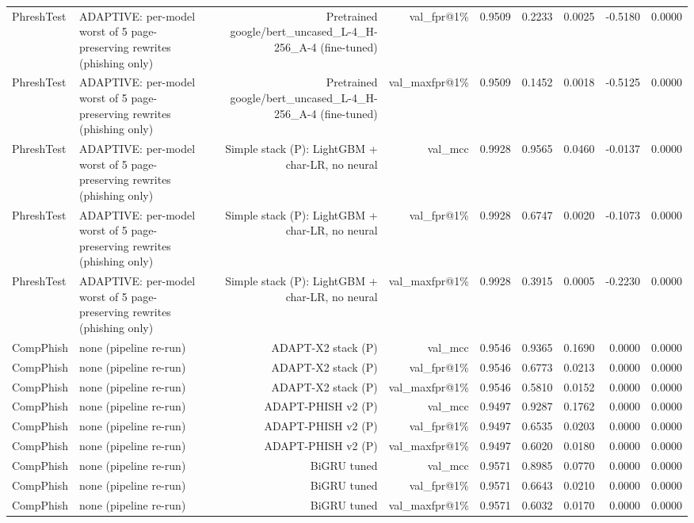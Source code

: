 \begin{table}[t]
\begin{tabular}{llrrrrrrr}
PhreshTest & ADAPTIVE: per-model worst of 5 page-preserving rewrites (phishing only) & Pretrained google/bert\_uncased\_L-4\_H-256\_A-4 (fine-tuned) & val\_fpr@1\% & 0.9509 & 0.2233 & 0.0025 & -0.5180 & 0.0000 \\
PhreshTest & ADAPTIVE: per-model worst of 5 page-preserving rewrites (phishing only) & Pretrained google/bert\_uncased\_L-4\_H-256\_A-4 (fine-tuned) & val\_maxfpr@1\% & 0.9509 & 0.1452 & 0.0018 & -0.5125 & 0.0000 \\
PhreshTest & ADAPTIVE: per-model worst of 5 page-preserving rewrites (phishing only) & Simple stack (P): LightGBM + char-LR, no neural & val\_mcc & 0.9928 & 0.9565 & 0.0460 & -0.0137 & 0.0000 \\
PhreshTest & ADAPTIVE: per-model worst of 5 page-preserving rewrites (phishing only) & Simple stack (P): LightGBM + char-LR, no neural & val\_fpr@1\% & 0.9928 & 0.6747 & 0.0020 & -0.1073 & 0.0000 \\
PhreshTest & ADAPTIVE: per-model worst of 5 page-preserving rewrites (phishing only) & Simple stack (P): LightGBM + char-LR, no neural & val\_maxfpr@1\% & 0.9928 & 0.3915 & 0.0005 & -0.2230 & 0.0000 \\
CompPhish & none (pipeline re-run) & ADAPT-X2 stack (P) & val\_mcc & 0.9546 & 0.9365 & 0.1690 & 0.0000 & 0.0000 \\
CompPhish & none (pipeline re-run) & ADAPT-X2 stack (P) & val\_fpr@1\% & 0.9546 & 0.6773 & 0.0213 & 0.0000 & 0.0000 \\
CompPhish & none (pipeline re-run) & ADAPT-X2 stack (P) & val\_maxfpr@1\% & 0.9546 & 0.5810 & 0.0152 & 0.0000 & 0.0000 \\
CompPhish & none (pipeline re-run) & ADAPT-PHISH v2 (P) & val\_mcc & 0.9497 & 0.9287 & 0.1762 & 0.0000 & 0.0000 \\
CompPhish & none (pipeline re-run) & ADAPT-PHISH v2 (P) & val\_fpr@1\% & 0.9497 & 0.6535 & 0.0203 & 0.0000 & 0.0000 \\
CompPhish & none (pipeline re-run) & ADAPT-PHISH v2 (P) & val\_maxfpr@1\% & 0.9497 & 0.6020 & 0.0180 & 0.0000 & 0.0000 \\
CompPhish & none (pipeline re-run) & BiGRU tuned & val\_mcc & 0.9571 & 0.8985 & 0.0770 & 0.0000 & 0.0000 \\
CompPhish & none (pipeline re-run) & BiGRU tuned & val\_fpr@1\% & 0.9571 & 0.6643 & 0.0210 & 0.0000 & 0.0000 \\
CompPhish & none (pipeline re-run) & BiGRU tuned & val\_maxfpr@1\% & 0.9571 & 0.6032 & 0.0170 & 0.0000 & 0.0000 \\

\end{tabular}
\end{table}
